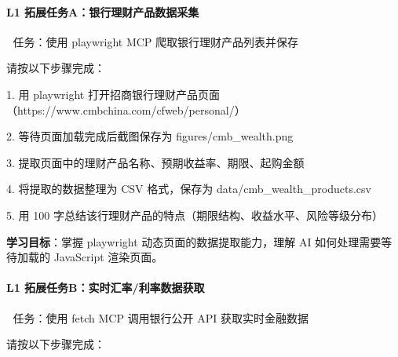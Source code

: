 \documentclass[
  american,
  chinese,
]{ctexart}
\begin{document}
\paragraph{\texorpdfstring{\foreignlanguage{american}{L1 }{拓展任务A：银行理财产品数据采集}}{L1 拓展任务A：银行理财产品数据采集}}\label{l1-ext-a-wealth}

\foreignlanguage{american}{🏦 }{任务：使用}\foreignlanguage{american}{ playwright MCP }{爬取银行理财产品列表并保存}\foreignlanguage{american}{}

{请按以下步骤完成：}\foreignlanguage{american}{}

\foreignlanguage{american}{1. }{用}\foreignlanguage{american}{ playwright }{打开招商银行理财产品页面}\foreignlanguage{american}{（}\foreignlanguage{american}{https://www.cmbchina.com/cfweb/personal/}{）}\foreignlanguage{american}{}

\foreignlanguage{american}{2. }{等待页面加载完成后截图保存为}\foreignlanguage{american}{ figures/cmb\_wealth.png}\foreignlanguage{american}{}

\foreignlanguage{american}{3. }{提取页面中的理财产品名称、预期收益率、期限、起购金额}\foreignlanguage{american}{}

\foreignlanguage{american}{4. }{将提取的数据整理为}\foreignlanguage{american}{ CSV }{格式，保存为}\foreignlanguage{american}{ data/cmb\_wealth\_products.csv}\foreignlanguage{american}{}

\foreignlanguage{american}{5. }{用}\foreignlanguage{american}{ 100 }{字总结该行理财产品的特点（期限结构、收益水平、风险等级分布）}\foreignlanguage{american}{}

\textbf{{学习目标}}{：掌握}\foreignlanguage{american}{ playwright }{{动态页面}}{的数据提取能力，理解}\foreignlanguage{american}{ AI }{{如何处理}}{需要等待加载的}\foreignlanguage{american}{ JavaScript }{渲染页面。}\foreignlanguage{american}{}

\paragraph{\texorpdfstring{\foreignlanguage{american}{L1 }{拓展任务B：实时汇率}\foreignlanguage{american}{/}{利率数据获取}}{L1 拓展任务B：实时汇率/利率数据获取}}\label{l1-ext-b-rate}

\foreignlanguage{american}{💱 }{任务：使用}\foreignlanguage{american}{ fetch MCP }{调用银行公开}\foreignlanguage{american}{ API }{获取实时金融数据}\foreignlanguage{american}{}

{请按以下步骤完成：}\foreignlanguage{american}{}
\end{document}
